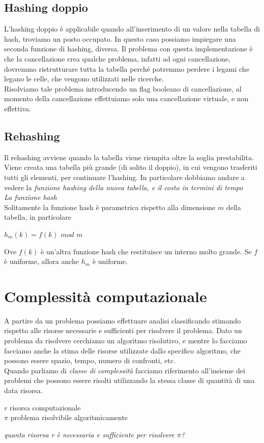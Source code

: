 \documentclass[11pt, oneside]{article}   	%
\begin{document}
\subsection*{Hashing doppio}
L'hashing doppio è applicabile quando all'inserimento di un valore nella tabella di hash, troviamo un posto occupato. In questo caso possiamo impiegare una seconda funzione di hashing, diversa.
Il problema con questa implementazione è che la cancellazione crea qualche problema, infatti ad ogni cancellazione, dovremmo ristrutturare tutta la tabella perché potremmo perdere i legami che legano le celle, che vengono utilizzati nelle ricerche.\\
Risolviamo tale problema introducendo un flag booleano di cancellazione, al momento della cancellazione effettuiamo solo una cancellazione virtuale, e non effettiva.
\subsection*{Rehashing}
Il rehashing avviene quando la tabella viene riempita oltre la soglia prestabilita. Viene creata una tabella più grande (di solito il doppio), in cui vengono trasferiti tutti gli elementi, per continuare l'hashing. In particolare dobbiamo andare a vedere la \emph{funzione hashing della nuova tabella, e il costo in termini di tempo}\\
\emph{La funzione hash}\\
Solitamente la funzione hash è parametrica rispetto alla dimensione $m$ della tabella, in particolare \begin{center}
$h_m(k) = f(k)$ $mod$ $m$
\end{center}
Ove $f(k)$ è un'altra funzione hash che restituisce un interno molto grande. Se $f$ è uniforme, allora anche $h_m$ è uniforme.
\section*{Complessità computazionale}
A partire da un problema possiamo effettuare analisi classificando stimando rispetto alle risorse necessarie e sufficienti per risolvere il problema. Dato un problema da risolvere cerchiamo un algoritmo risolutivo, e mentre lo facciamo facciamo anche la stima delle risorse utilizzate dallo specifico algoritmo, che possono essere spazio, tempo, numero di confronti, etc. \\
Quando parliamo di \emph{classe di complessità} facciamo riferimento all'insieme dei problemi che possono essere risolti utilizzando la stessa classe di quantità di una data risorsa.
\begin{center}
$r$ risorsa computazionale\\
$\pi$ problema risolvibile algoritmicamente
\end{center}
\emph{quanta risorsa r è necessaria e sufficiente per risolvere $\pi$?}
\end{document}

